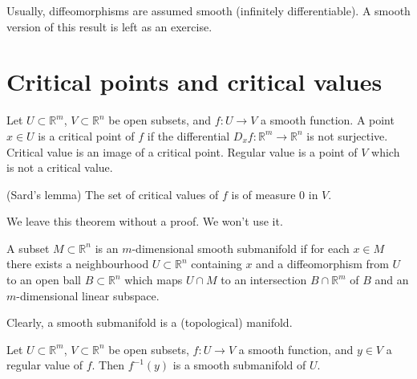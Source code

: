 \medskip\noindent
Usually, diffeomorphisms are assumed smooth
(infinitely differentiable). A smooth
version of this result is left as an
exercise.

\section{Critical points and critical values}
\label{section-critical-points-and-critical-values}

\begin{definition}
\label{definition-critical-point-value}
Let $U \subset \mathbb{R}^m$, $V \subset
\mathbb{R}^n$ be open subsets, and $f:U \to
V$ a smooth function. A point $x \in U$ is a
critical point of $f$ if the differential
$D_xf:\mathbb{R}^m \to \mathbb{R}^n$ is not
surjective. Critical value is an image of a
critical point. Regular value is a point of
$V$ which is not a critical value.
\end{definition}

\begin{theorem}
\label{theorem-sard-lemma}
(Sard's lemma)
The set of critical values of $f$ is of
measure $0$ in $V$.
\end{theorem}

\medskip\noindent
We leave this theorem without a proof. We
won't use it.

\begin{definition}
\label{definition-smooth-submanifold}
A subset $M \subset \mathbb{R}^n$ is an
$m$-dimensional smooth submanifold if for
each $x \in M$ there exists a neighbourhood
$U \subset \mathbb{R}^n$ containing $x$ and a
diffeomorphism from $U$ to an open ball $B
\subset \mathbb{R}^n$ which maps $U \cap M$
to an intersection $B \cap \mathbb{R}^m$ of
$B$ and an $m$-dimensional linear subspace.
\end{definition}

\medskip\noindent
Clearly, a smooth submanifold is a
(topological) manifold.

\begin{theorem}
\label{theorem-regular-fiber-submanifold}
Let $U \subset \mathbb{R}^m$, $V \subset
\mathbb{R}^n$ be open subsets,
$f:U \to V$ a smooth function, and $y \in V$
a regular value of $f$. Then $f^{-1}(y)$ is
a smooth submanifold of $U$.
\end{theorem}

